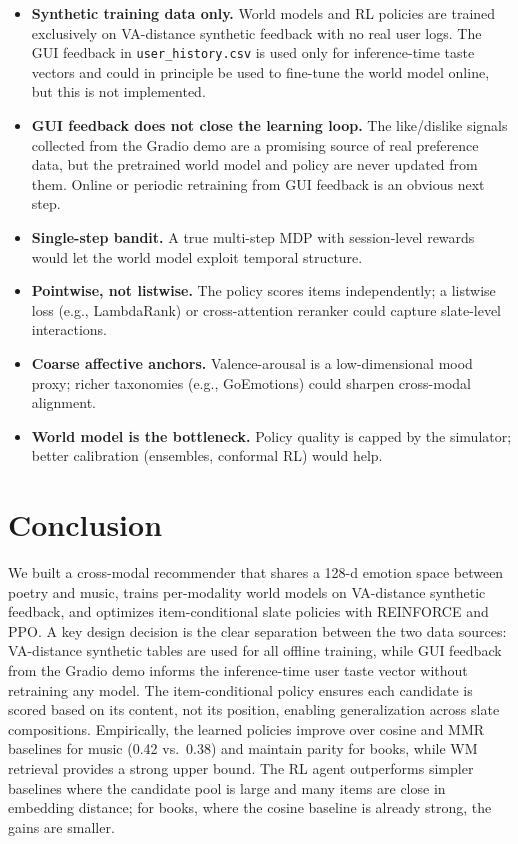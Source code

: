 \documentclass[11pt]{article}
\begin{document}
\begin{itemize}[leftmargin=*, itemsep=2pt]
    \item \textbf{Synthetic training data only.} World models and RL
    policies are trained exclusively on VA-distance synthetic feedback
    with no real user logs. The GUI feedback in
    \texttt{user\_history.csv} is used only for inference-time taste
    vectors and could in principle be used to fine-tune the world model
    online, but this is not implemented.
    \item \textbf{GUI feedback does not close the learning loop.} The
    like/dislike signals collected from the Gradio demo are a promising
    source of real preference data, but the pretrained world model and
    policy are never updated from them. Online or periodic retraining
    from GUI feedback is an obvious next step.
    \item \textbf{Single-step bandit.} A true multi-step MDP with
    session-level rewards would let the world model exploit temporal
    structure.
    \item \textbf{Pointwise, not listwise.} The policy scores items
    independently; a listwise loss (e.g., LambdaRank) or cross-attention
    reranker could capture slate-level interactions.
    \item \textbf{Coarse affective anchors.} Valence-arousal is a
    low-dimensional mood proxy; richer taxonomies (e.g., GoEmotions)
    could sharpen cross-modal alignment.
    \item \textbf{World model is the bottleneck.} Policy quality is
    capped by the simulator; better calibration (ensembles, conformal RL)
    would help.
\end{itemize}

\section{Conclusion}
\label{sec:conclusion}

We built a cross-modal recommender that shares a 128-d emotion space
between poetry and music, trains per-modality world models on
VA-distance synthetic feedback, and optimizes item-conditional slate
policies with REINFORCE and PPO. A key design decision is the clear
separation between the two data sources: VA-distance synthetic tables
are used for all offline training, while GUI feedback from the Gradio
demo informs the inference-time user taste vector without retraining any
model. The item-conditional policy ensures each candidate is scored
based on its content, not its position, enabling generalization across
slate compositions. Empirically, the learned policies improve over
cosine and MMR baselines for music (0.42 vs.\ 0.38) and maintain parity
for books, while WM retrieval provides a strong upper bound. The RL
agent outperforms simpler baselines where the candidate pool is large
and many items are close in embedding distance; for books, where the
cosine baseline is already strong, the gains are smaller.
\end{document}
